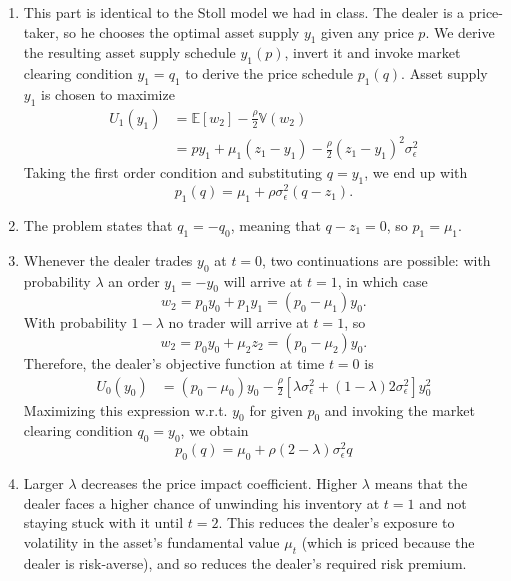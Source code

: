 \begin{solution}
	\begin{enumerate}
		\item This part is identical to the Stoll model we had in class. The dealer is a price-taker, so he chooses the optimal asset supply $y_1$ given any price $p$. We derive the resulting asset supply schedule $y_1(p)$, invert it and invoke market clearing condition $y_1=q_1$ to derive the price schedule $p_1(q)$. Asset supply $y_1$ is chosen to maximize
		\begin{align*}
			U_1(y_1) &= \mathbb{E}[w_2] - \frac{\rho}{2} \mathbb{V}(w_2)
			\\
			&= p y_1 + \mu_1 (z_1-y_1) - \frac{\rho}{2} (z_1-y_1)^2 \sigma^2_\epsilon
		\end{align*}
		Taking the first order condition and substituting $q = y_1$, we end up with
		\[ p_1(q) = \mu_1 + \rho \sigma^2_\epsilon (q-z_1). \]
		
		\item The problem states that $q_1 = -q_0$, meaning that $q-z_1 = 0$, so $p_1 = \mu_1$.
		
		\item Whenever the dealer trades $y_0$ at $t=0$, two continuations are possible: with probability $\lambda$ an order $y_1 = -y_0$ will arrive at $t=1$, in which case
		\[ w_2 = p_0 y_0 + p_1 y_1 = (p_0 - \mu_1) y_0. \]
		With probability $1-\lambda$ no trader will arrive at $t=1$, so
		\[ w_2 = p_0 y_0 + \mu_2 z_2 = (p_0 - \mu_2) y_0. \]
		Therefore, the dealer's objective function at time $t=0$ is
		\begin{align}
			U_0(y_0) &= (p_0 - \mu_0) y_0 - \frac{\rho}{2} \left[ \lambda \sigma^2_\epsilon + (1-\lambda) 2 \sigma^2_\epsilon \right] y_0^2 \label{eq:S1}
		\end{align}
		Maximizing this expression w.r.t. $y_0$ for given $p_0$ and invoking the market clearing condition $q_0 = y_0$, we obtain
		\begin{equation}
			p_0(q) = \mu_0 + \rho (2-\lambda) \sigma_\epsilon^2 q \label{eq:S2}
		\end{equation}
		
		\item Larger $\lambda$ decreases the price impact coefficient. Higher $\lambda$ means that the dealer faces a higher chance of unwinding his inventory at $t=1$ and not staying stuck with it until $t=2$. This reduces the dealer's exposure to volatility in the asset's fundamental value $\mu_t$ (which is priced because the dealer is risk-averse), and so reduces the dealer's required risk premium.
		

\end{enumerate}
\end{solution}
